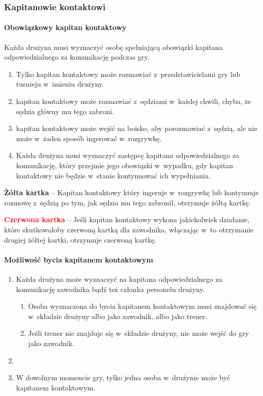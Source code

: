 \documentclass[12pt]{article}
\newcommand\redcard[1]{\bgroup\textcolor{red}{\textbf{#1}}}
\newcommand\yellowcard[1]{\bgroup\textcolor{darkyellow}{\textbf{#1}}}
\begin{document}
\subsubsection{Kapitanowie kontaktowi}

\paragraph{Obowiązkowy kapitan kontaktowy}
Każda drużyna musi wyznaczyć
osobę spełniającą obowiązki kapitana odpowiedzialnego za komunikację
podczas gry.

\begin{enumerate}
	\item Tylko kapitan kontaktowy może rozmawiać z~przedstawicielami gry lub
	      turnieju w~imieniu drużyny.

	\item kapitan kontaktowy może rozmawiać z~sędziami w~każdej chwili, chyba,
	      że sędzia główny mu tego zabroni.

	\item kapitan kontaktowy może wejść na boisko, aby porozmawiać z~sędzią,
	      ale nie może w~żaden sposób ingerować w~rozgrywkę.

	\item Każda drużyna musi wyznaczyć zastępcę kapitana odpowiedzialnego za
	      komunikację, który przejmie jego obowiązki w~wypadku, gdy kapitan
	      kontaktowy nie będzie w~stanie kontynuować ich wypełniania.
\end{enumerate}

\yellowcard{Żółta kartka} -- Kapitan kontaktowy który ingeruje w~rozgrywkę lub
kontynuuje rozmowę z~sędzią po tym, jak sędzia mu tego zabronił,
otrzymuje żółtą kartkę.

\redcard{Czerwona kartka} -- Jeśli kapitan kontaktowy wykona jakiekolwiek
działanie, które skutkowałoby czerwoną kartką dla zawodnika, włączając w~to otrzymanie drugiej żółtej kartki, otrzymuje czerwoną kartkę.

\paragraph{Możliwość bycia kapitanem kontaktowym}

\begin{enumerate}
	\item
	      Każda drużyna może wyznaczyć na kapitana odpowiedzialnego za
	      komunikację zawodnika bądź też członka personelu drużyny.

	      \begin{enumerate}
		      \item
		            Osoba wyznaczona do bycia kapitanem kontaktowym musi znajdować się w~składzie drużyny albo jako zawodnik, albo jako trener.
		      \item
		            Jeśli trener nie znajduje się w~składzie drużyny, nie może wejść do
		            gry jako zawodnik.
	      \end{enumerate}
	\item
	\item W dowolnym momencie gry, tylko jedna osoba w~drużynie może być
	      kapitanem kontaktowym.
\end{enumerate}
\end{document}
